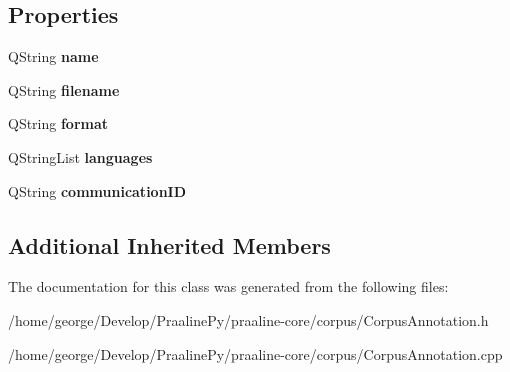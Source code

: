 \subsection*{Properties}
\begin{DoxyCompactItemize}
\item 
\mbox{\label{class_corpus_annotation_a445c4bbf129abd28b244699ac6fa0c83}} 
Q\+String {\bfseries name}
\item 
\mbox{\label{class_corpus_annotation_a2f719c17ffb4ddc3e5877b1120971eb6}} 
Q\+String {\bfseries filename}
\item 
\mbox{\label{class_corpus_annotation_a3ac440c36ef040cb9e20173eb85f571b}} 
Q\+String {\bfseries format}
\item 
\mbox{\label{class_corpus_annotation_ad9cabcfae5f6ea6aba1b66f9e5e92ab9}} 
Q\+String\+List {\bfseries languages}
\item 
\mbox{\label{class_corpus_annotation_a10eea3344873ffd772f7cb43639a6678}} 
Q\+String {\bfseries communication\+ID}
\end{DoxyCompactItemize}
\subsection*{Additional Inherited Members}


The documentation for this class was generated from the following files\+:\begin{DoxyCompactItemize}
\item 
/home/george/\+Develop/\+Praaline\+Py/praaline-\/core/corpus/Corpus\+Annotation.\+h\item 
/home/george/\+Develop/\+Praaline\+Py/praaline-\/core/corpus/Corpus\+Annotation.\+cpp\end{DoxyCompactItemize}
